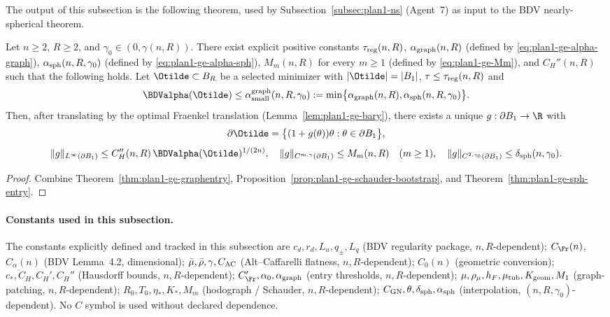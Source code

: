 The output of this subsection is the following theorem, used by
Subsection~\ref{subsec:plan1-ns} (Agent~7) as input to the BDV
nearly-spherical theorem.

\begin{theorem}
\label{thm:plan1-ge-main}
Let \(n\ge 2\), \(R\ge 2\), and \(\gamma_0\in(0,\gamma(n,R))\). There
exist explicit positive constants \(\tau_{\rm reg}(n,R)\),
\(\alpha_{\rm graph}(n,R)\) (defined by \eqref{eq:plan1-ge-alpha-graph}),
\(\alpha_{\rm sph}(n,R,\gamma_0)\) (defined by
\eqref{eq:plan1-ge-alpha-sph}), \(M_m(n,R)\) for every
\(m\ge 1\) (defined by \eqref{eq:plan1-ge-Mm}), and \(C_H''(n,R)\) such
that the following holds. Let \(\Otilde\subset B_R\) be a selected
minimizer with \(|\Otilde|=|B_1|\), \(\tau\le\tau_{\rm reg}(n,R)\) and
\[
   \BDValpha(\Otilde)\le\alpha_{\rm small}^{\rm graph}(n,R,\gamma_0)
   :=\min\bigl\{\alpha_{\rm graph}(n,R),\alpha_{\rm sph}(n,R,\gamma_0)\bigr\}.
\]
Then, after translating by the optimal Fraenkel translation
(Lemma~\ref{lem:plan1-ge-bary}), there exists a unique
\(g:\partial B_1\to\R\) with
\[
   \partial\Otilde=\bigl\{(1+g(\theta))\theta:\theta\in\partial B_1\bigr\},
\]
\[
   \|g\|_{L^\infty(\partial B_1)}\le C_H''(n,R)\,\BDValpha(\Otilde)^{1/(2n)},\quad
   \|g\|_{C^{m,\gamma}(\partial B_1)}\le M_m(n,R)\quad(m\ge 1),\quad
   \|g\|_{C^{2,\gamma_0}(\partial B_1)}\le\delta_{\rm sph}(n,\gamma_0).
\]
\end{theorem}

\begin{proof}
Combine Theorem~\ref{thm:plan1-ge-graphentry},
Proposition~\ref{prop:plan1-ge-schauder-bootstrap}, and
Theorem~\ref{thm:plan1-ge-sph-entry}.
\end{proof}

\paragraph{Constants used in this subsection.}
The constants explicitly defined and tracked in this subsection are
\(c_d,r_d,L_u,q_\pm,L_q\) (BDV regularity package, \(n,R\)-dependent);
\(C_{\Fr}(n)\), \(C_\alpha(n)\) (BDV Lemma~4.2, dimensional);
\(\bar\mu,\bar\rho,\gamma,C_{\rm AC}\) (Alt--Caffarelli flatness,
\(n,R\)-dependent); \(C_0(n)\) (geometric conversion);
\(c_*,C_H,C_H',C_H''\) (Hausdorff bounds, \(n,R\)-dependent);
\(C_{\Fr}',\alpha_0,\alpha_{\rm graph}\) (entry thresholds,
\(n,R\)-dependent); \(\mu,\rho_\mu,h_F,\mu_{\rm tub},K_{\rm geom},M_1\)
(graph-patching, \(n,R\)-dependent); \(R_0,T_0,\eta_*,K_*,M_m\)
(hodograph / Schauder, \(n,R\)-dependent); \(C_{\rm GN},\theta,\delta_{\rm sph},
\alpha_{\rm sph}\) (interpolation, \((n,R,\gamma_0)\)-dependent). No
\(C\) symbol is used without declared dependence.

